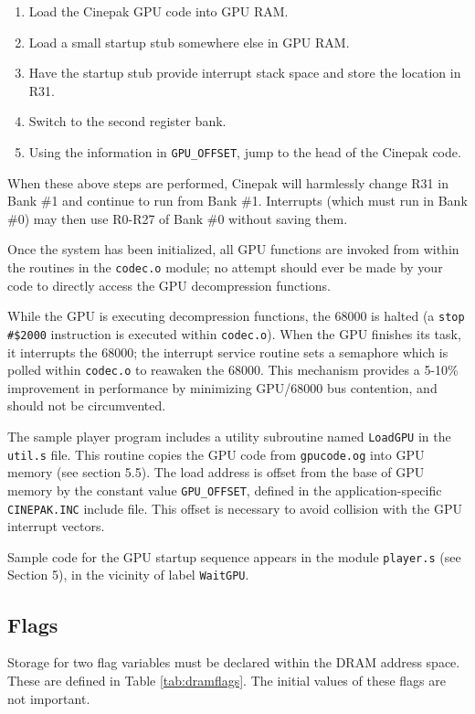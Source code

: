 \documentclass[12pt,letterpaper,twoside]{article}
\begin{document}
\begin{enumerate}[nosep, left=0pt .. 36pt]
\item Load the Cinepak GPU code into GPU RAM.
\item Load a small startup stub somewhere else in GPU RAM.
\item Have the startup stub provide interrupt stack space and store the location in R31.
\item Switch to the second register bank.
\item Using the information in \texttt{GPU\_OFFSET}, jump to the head of the Cinepak code.
\end{enumerate}

When these above steps are performed, Cinepak will harmlessly change R31 in Bank \#1 and continue to run from Bank \#1. Interrupts (which must run in Bank \#0) may then use R0-R27 of Bank \#0 without saving them.

Once the system has been initialized, all GPU functions are invoked from within the routines in the \texttt{codec.o} module; no attempt should ever be made by your code to directly access the GPU decompression functions.

While the GPU is executing decompression functions, the 68000 is halted (a \texttt{stop \#\$2000} instruction is executed within \texttt{codec.o}). When the GPU finishes its task, it interrupts the 68000; the interrupt service routine sets a semaphore which is polled within \texttt{codec.o} to reawaken the 68000. This mechanism provides a 5-10\% improvement in performance by minimizing GPU/68000 bus contention, and should not be circumvented.

The sample player program includes a utility subroutine named \texttt{LoadGPU} in the \texttt{util.s} file. This routine copies the GPU code from \texttt{gpucode.og} into GPU memory (see section 5.5). The load address is offset from the base of GPU memory by the constant value \texttt{GPU\_OFFSET}, defined in the application-specific \texttt{CINEPAK.INC} include file. This offset is necessary to avoid collision with the GPU interrupt vectors.

Sample code for the GPU startup sequence appears in the module \texttt{player.s} (see Section 5), in the vicinity of label \texttt{WaitGPU}.

\subsection{Flags}
Storage for two flag variables must be declared within the DRAM address space. These are defined in Table \ref{tab:dramflags}. The initial values of these flags are not important.
\end{document}

